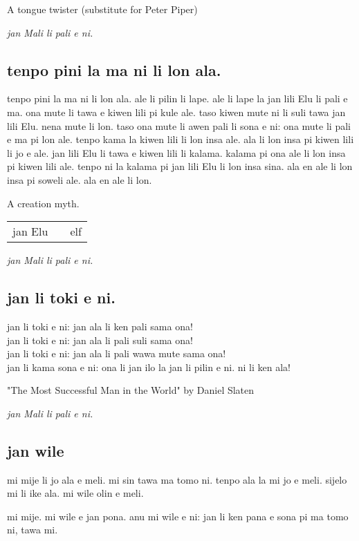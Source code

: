 A tongue twister (substitute for Peter Piper)

\textit{jan Mali li pali e ni. \cite{www:astrodonunt:01}}

\subsection{tenpo pini la ma ni li lon ala.}
tenpo pini la ma ni li lon ala.
ale li pilin li lape.
ale li lape la jan lili Elu li pali e ma.
ona mute li tawa e kiwen lili pi kule ale.
taso kiwen mute ni li suli tawa jan lili Elu.
nena mute li lon.
taso ona mute li awen pali li sona e ni: ona mute li pali e ma pi lon ale.
tenpo kama la kiwen lili li lon insa ale.
ala li lon insa pi kiwen lili li jo e ale.
jan lili Elu li tawa e kiwen lili li kalama.
kalama pi ona ale li lon insa pi kiwen lili ale.
tenpo ni la kalama pi jan lili Elu li lon insa sina.
ala en ale li lon insa pi soweli ale.
ala en ale li lon.

A creation myth.

\begin{supertabular}{p{5,5cm}|ll}
    jan Elu &  & elf \\
\end{supertabular}

\textit{jan Mali li pali e ni. \cite{www:astrodonunt:01}}

\subsection{jan li toki e ni.}
jan li toki e ni: jan ala li ken pali sama ona! \\
jan li toki e ni: jan ala li pali suli sama ona! \\
jan li toki e ni: jan ala li pali wawa mute sama ona! \\
jan li kama sona e ni: ona li jan ilo la jan li pilin e ni. ni li ken ala!

"The Most Successful Man in the World" by Daniel Slaten

\textit{jan Mali li pali e ni. \cite{www:astrodonunt:01}}

\newpage

\subsection{jan wile}
mi mije li jo ala e meli.
mi sin tawa ma tomo ni.
tenpo ala la mi jo e meli.
sijelo mi li ike ala.
mi wile olin e meli.

mi mije.
mi wile e jan pona.
anu mi wile e ni: jan li ken pana e sona pi ma tomo ni, tawa mi.

